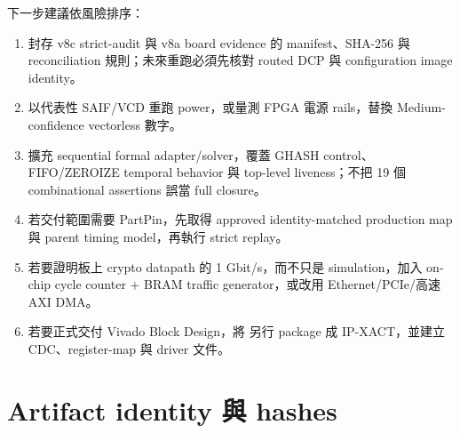 \documentclass[UTF8,fontset=none,11pt,a4paper]{ctexrep}
\newcommand{\code}[1]{\texttt{\detokenize{#1}}}
\begin{document}
下一步建議依風險排序：

\begin{enumerate}
  \item 封存 v8c strict-audit 與 v8a board evidence 的 manifest、SHA-256 與 reconciliation 規則；未來重跑必須先核對 routed DCP 與 configuration image identity。
  \item 以代表性 SAIF/VCD 重跑 power，或量測 FPGA 電源 rails，替換 Medium-confidence vectorless 數字。
  \item 擴充 sequential formal adapter/solver，覆蓋 GHASH control、FIFO/ZEROIZE temporal behavior 與 top-level liveness；不把 19 個 combinational assertions 誤當 full closure。
  \item 若交付範圍需要 PartPin，先取得 approved identity-matched production map 與 parent timing model，再執行 strict replay。
  \item 若要證明板上 crypto datapath 的 1 Gbit/s，而不只是 simulation，加入 on-chip cycle counter + BRAM traffic generator，或改用 Ethernet/PCIe/高速 AXI DMA。
  \item 若要正式交付 Vivado Block Design，將 \code{aes_gcm_axi_top} 另行 package 成 IP-XACT，並建立 CDC、register-map 與 driver 文件。
\end{enumerate}

\appendix
\chapter{Artifact identity 與 hashes}
\end{document}
